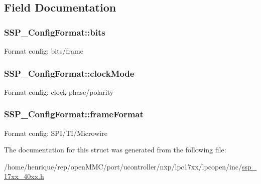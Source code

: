 \subsection{Field Documentation}
\hypertarget{structSSP__ConfigFormat_afaeb54b5e0525adda38644d3ef84dca1}{
\subsubsection[{bits}]{ S\-S\-P\-\_\-\-Config\-Format\-::bits}}\label{structSSP__ConfigFormat_afaeb54b5e0525adda38644d3ef84dca1}
Format config\-: bits/frame \hypertarget{structSSP__ConfigFormat_a910e709c7d9e6e367a26028a939b69cf}{
\subsubsection[{clock\-Mode}]{ S\-S\-P\-\_\-\-Config\-Format\-::clock\-Mode}}\label{structSSP__ConfigFormat_a910e709c7d9e6e367a26028a939b69cf}
Format config\-: clock phase/polarity \hypertarget{structSSP__ConfigFormat_ae702ac713d3aa81bffdf140ad8942ec7}{
\subsubsection[{frame\-Format}]{ S\-S\-P\-\_\-\-Config\-Format\-::frame\-Format}}\label{structSSP__ConfigFormat_ae702ac713d3aa81bffdf140ad8942ec7}
Format config\-: S\-P\-I/\-T\-I/\-Microwire 

The documentation for this struct was generated from the following file\-:\begin{DoxyCompactItemize}
\item 
/home/henrique/rep/open\-M\-M\-C/port/ucontroller/nxp/lpc17xx/lpcopen/inc/\hyperlink{ssp__17xx__40xx_8h}{ssp\-\_\-17xx\-\_\-40xx.\-h}\end{DoxyCompactItemize}
